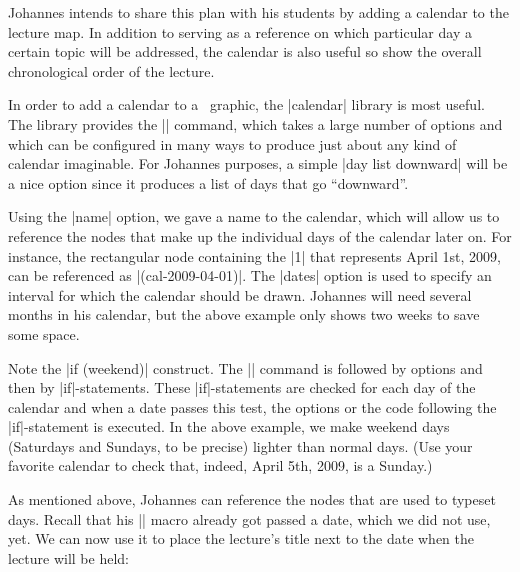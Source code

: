 Johannes intends to share this plan with his students by adding a
calendar to the lecture map. In addition to serving as a reference
on which particular day a certain  topic will be addressed, the
calendar is also useful so show the overall chronological order of the
lecture.

In order to add a calendar to a \tikzname\ graphic, the |calendar|
library is most useful. The library provides the |\calendar| command,
which takes a large number of options and which can be configured in
many ways to produce just about any kind of calendar imaginable. For
Johannes purposes, a simple |day list downward| will be a nice option
since it produces a list of days that go ``downward''.

\begin{codeexample}
\tiny
{}
\end{codeexample}

Using the |name| option, we gave a name to the calendar, which will
allow us to reference the nodes that make up the individual days of
the calendar later on. For instance, the rectangular node containing the
|1| that represents April 1st, 2009, can be referenced as
|(cal-2009-04-01)|. The |dates| option is used to specify an 
interval for which the calendar should be drawn. Johannes will need
several months in his calendar, but the above example only shows two
weeks to save some space.

Note the |if (weekend)| construct. The |\calendar| command is followed
by options and then by |if|-statements. These |if|-statements are
checked for each day of the calendar and when a date passes this test,
the options or the code following the |if|-statement is executed. In
the above example, we make weekend days (Saturdays and Sundays, to be
precise) lighter than normal days. (Use your favorite calendar to
check that, indeed, April 5th, 2009, is a Sunday.)

As mentioned above, Johannes can reference the nodes that are used to
typeset days. Recall that his |\lecture| macro already got passed a
date, which we did not use, yet. We can now use it to place the
lecture's title next to the date when the lecture will be held:


\begin{codeexample}
\def\lecture#1#2#3#4#5#6{
  \node [annotation, #3, scale=0.65, text width=4cm, inner sep=2mm] at (#4) {
    Lecture #1: \textcolor{orange}{\textbf{#2}}
    \list{--}{\topsep=2pt\itemsep=0pt\parsep=0pt
              \parskip=0pt\labelwidth=8pt\leftmargin=8pt
              \itemindent=0pt\labelsep=2pt}
    #5
    \endlist
  };
  \node [anchor=base west] at (cal-#6.base east) {\textcolor{orange}{\textbf{#2}}};
}
\end{codeexample}
\def\lecture#1#2#3#4#5#6{
  \node [anchor=base west] at (cal-#6.base east) {\textcolor{orange}{\textbf{#2}}};
}

